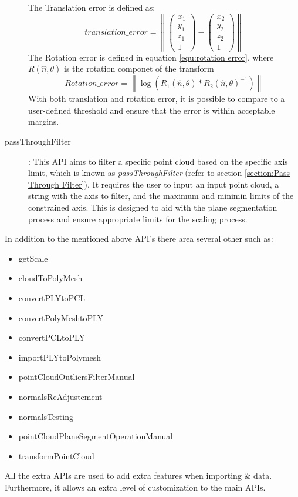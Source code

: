 \documentclass[12pt]{report}
\begin{document}
\begin{description}
   The Translation error is defined as:
   \begin{equation}
     translation\_error = \left\lVert \begin{pmatrix} x_1 \\y_1\\z_1\\1  \end{pmatrix} - \begin{pmatrix} x_2 \\y_2\\z_2\\1  \end{pmatrix} \right\rVert    
    \label{equ:translation error}
    \end{equation}
   The Rotation error is defined in equation \ref{equ:rotation error}, where $R(\hat{n},\theta)$ is the rotation componet of the transform 
   \begin{equation}
     Rotation\_error =\left\lVert \log (R_1(\hat{n},\theta) * R_2(\hat{n},\theta)^{-1} ) \right\rVert
     \label{equ:rotation error} 
   \end{equation}
 With both translation and rotation error, it is possible to compare to a user-defined threshold and ensure that the error is within acceptable margins. 
 \label{scale_API}
  \item[passThroughFilter]: This API aims to filter a specific point cloud based on the specific axis limit, which is known as \textit{passThroughFilter} (refer to section \ref{section:Pass Through Filter}).
  It requires the user to input an input point cloud, a string with the axis to filter, and the maximum and minimin limits of the constrained axis. This is designed to aid with the plane segmentation process and ensure appropriate limits for the scaling process.  
\end{description}

In addition to the mentioned above API's there area several other such as:
\begin{multicols}{2}
\begin{itemize}
  \itemsep0em 
  \item getScale
  \item cloudToPolyMesh
  \item convertPLYtoPCL
  \item convertPolyMeshtoPLY
  \item convertPCLtoPLY
  \item importPLYtoPolymesh
  \item pointCloudOutliersFilterManual
  \item normalsReAdjustement
  \item normalsTesting 
  \item pointCloudPlaneSegmentOperationManual
  \item transformPointCloud
\end{itemize}
\end{multicols}
All the extra APIs are used to add extra features when importing \& data. Furthermore, it allows an extra level of customization to the main APIs.  
\end{document}
